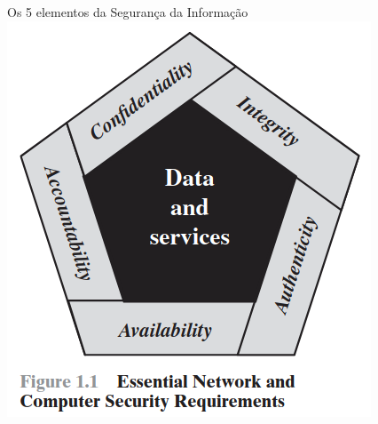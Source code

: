 \begin{frame}{Os 5 elementos da Segurança da Informação}
\centering
    \includegraphics[width=0.5\linewidth]{Figuras/Figure1.1.png}
    





\end{frame}





